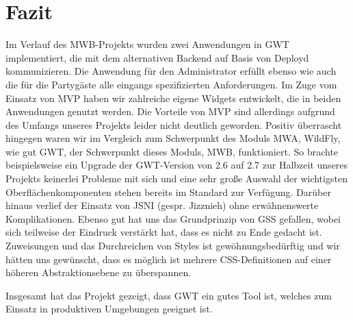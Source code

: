 \section{Fazit}
Im Verlauf des MWB-Projekts wurden zwei Anwendungen in GWT implementiert, die mit dem alternativen Backend auf Basis von Deployd kommunizieren. Die Anwendung für den Administrator erfüllt ebenso wie auch die für die Partygäste alle eingangs spezifizierten Anforderungen. Im Zuge vom Einsatz von MVP haben wir zahlreiche eigene Widgets entwickelt, die in beiden Anwendungen genutzt werden. Die Vorteile von MVP sind allerdings aufgrund des Umfangs unseres Projekts leider nicht deutlich geworden. Positiv überrascht hingegen waren wir im Vergleich zum Schwerpunkt des Moduls MWA, WildFly, wie gut GWT, der Schwerpunkt dieses Moduls, MWB, funktioniert. So brachte beispielsweise ein Upgrade der GWT-Version von 2.6 auf 2.7 zur Halbzeit unseres Projekts keinerlei Probleme mit sich und eine sehr große Auswahl der wichtigsten Oberflächenkomponenten stehen bereits im Standard zur Verfügung. Darüber hinaus verlief der Einsatz von JSNI (gespr. Jizznieh) ohne erwähnenswerte Komplikationen. Ebenso gut hat uns das Grundprinzip von GSS gefallen, wobei sich teilweise der Eindruck verstärkt hat, dass es nicht zu Ende gedacht ist. Zuweisungen und das Durchreichen von Styles ist gewöhnungsbedürftig und wir hätten uns gewünscht, dass es möglich ist mehrere CSS-Definitionen auf einer höheren Abstraktionsebene zu überspannen.

Insgesamt hat das Projekt gezeigt, dass GWT ein gutes Tool ist, welches zum Einsatz in produktiven Umgebungen geeignet ist.
